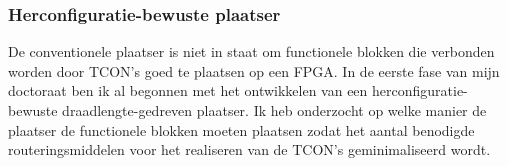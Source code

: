 \documentclass[a4paper,oneside,12pt]{article}
\begin{document}




\subsubsection{Herconfiguratie-bewuste plaatser}\label{plaatser}

De conventionele plaatser is niet in staat om functionele blokken die verbonden worden door TCON's goed te plaatsen op een FPGA. In de eerste fase van mijn doctoraat ben ik al begonnen met het ontwikkelen van een herconfiguratie-bewuste draadlengte-gedreven plaatser. Ik heb onderzocht op welke manier de plaatser de functionele blokken moeten plaatsen zodat het aantal benodigde routeringsmiddelen voor het realiseren van de TCON's geminimaliseerd wordt.
\end{document}
